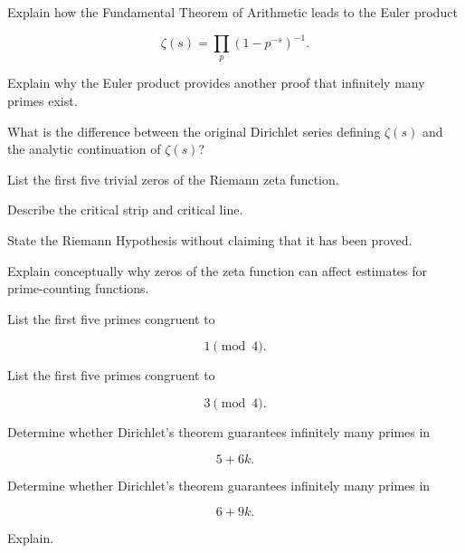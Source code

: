 \begin{exercise}[3]
Explain how the Fundamental Theorem of Arithmetic leads to the Euler product

\[ \zeta(s)=\prod_p(1-p^{-s})^{-1}. \]
\end{exercise}

\begin{exercise}[2]
Explain why the Euler product provides another proof that infinitely many
primes exist.
\end{exercise}

\begin{exercise}[2]
What is the difference between the original Dirichlet series defining
\(\zeta(s)\) and the analytic continuation of \(\zeta(s)\)?
\end{exercise}

\begin{exercise}[1]
List the first five trivial zeros of the Riemann zeta function.
\end{exercise}

\begin{exercise}[2]
Describe the critical strip and critical line.
\end{exercise}

\begin{exercise}[2]
State the Riemann Hypothesis without claiming that it has been proved.
\end{exercise}

\begin{exercise}[2]
Explain conceptually why zeros of the zeta function can affect estimates for
prime-counting functions.
\end{exercise}

\begin{exercise}[1]
List the first five primes congruent to

\[ 1\pmod4. \]
\end{exercise}

\begin{exercise}[1]
List the first five primes congruent to

\[ 3\pmod4. \]
\end{exercise}

\begin{exercise}[2]
Determine whether Dirichlet's theorem guarantees infinitely many primes in

\[ 5+6k. \]
\end{exercise}

\begin{exercise}[2]
Determine whether Dirichlet's theorem guarantees infinitely many primes in

\[ 6+9k. \]

Explain.
\end{exercise}

